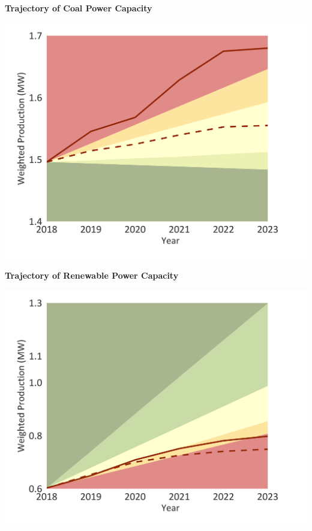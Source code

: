 \documentclass[10pt,table,a4]{article}\usepackage[]{graphicx}\usepackage[]{color}
\begin{document}
	\begin{minipage}[t]{.49\linewidth}
		\textbf{Trajectory of Coal Power Capacity }
		
		\includegraphics[trim = {0 0cm 0 0},width=1\linewidth]{CAFigures/Fig17}
		
		\textbf{Trajectory of Renewable Power Capacity }
		
		\includegraphics[trim = {0 0cm 0 0},width=.99\linewidth]{CAFigures/Fig18}
	\end{minipage}	
	\hspace{.02\linewidth}
\end{document}
